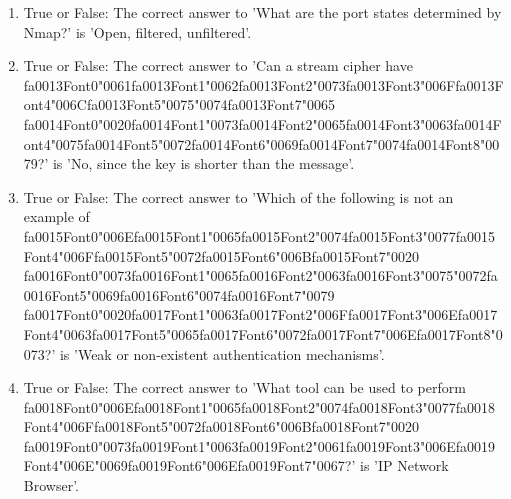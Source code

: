 \documentclass[12pt]{article}
\begin{document}
\begin{enumerate}[label=\arabic*.]
\item True or False: The correct answer to 'What are the port states determined by Nmap?' is 'Open, filtered, unfiltered'.
\item True or False: The correct answer to 'Can a stream cipher have {\csname fa0013Font0\endcsname\char"0061}{\csname fa0013Font1\endcsname\char"0062}{\csname fa0013Font2\endcsname\char"0073}{\csname fa0013Font3\endcsname\char"006F}{\csname fa0013Font4\endcsname\char"006C}{\csname fa0013Font5\endcsname\char"0075}{\char"0074}{\csname fa0013Font7\endcsname\char"0065} {\csname fa0014Font0\endcsname\char"0020}{\csname fa0014Font1\endcsname\char"0073}{\csname fa0014Font2\endcsname\char"0065}{\csname fa0014Font3\endcsname\char"0063}{\csname fa0014Font4\endcsname\char"0075}{\csname fa0014Font5\endcsname\char"0072}{\csname fa0014Font6\endcsname\char"0069}{\csname fa0014Font7\endcsname\char"0074}{\csname fa0014Font8\endcsname\char"0079}?' is 'No, since the key is shorter than the message'.
\item True or False: The correct answer to 'Which of the following is not an example of {\csname fa0015Font0\endcsname\char"006E}{\csname fa0015Font1\endcsname\char"0065}{\csname fa0015Font2\endcsname\char"0074}{\csname fa0015Font3\endcsname\char"0077}{\csname fa0015Font4\endcsname\char"006F}{\csname fa0015Font5\endcsname\char"0072}{\csname fa0015Font6\endcsname\char"006B}{\csname fa0015Font7\endcsname\char"0020} {\csname fa0016Font0\endcsname\char"0073}{\csname fa0016Font1\endcsname\char"0065}{\csname fa0016Font2\endcsname\char"0063}{\csname fa0016Font3\endcsname\char"0075}{\char"0072}{\csname fa0016Font5\endcsname\char"0069}{\csname fa0016Font6\endcsname\char"0074}{\csname fa0016Font7\endcsname\char"0079} {\csname fa0017Font0\endcsname\char"0020}{\csname fa0017Font1\endcsname\char"0063}{\csname fa0017Font2\endcsname\char"006F}{\csname fa0017Font3\endcsname\char"006E}{\csname fa0017Font4\endcsname\char"0063}{\csname fa0017Font5\endcsname\char"0065}{\csname fa0017Font6\endcsname\char"0072}{\csname fa0017Font7\endcsname\char"006E}{\csname fa0017Font8\endcsname\char"0073}?' is 'Weak or non-existent authentication mechanisms'.
\item True or False: The correct answer to 'What tool can be used to perform {\csname fa0018Font0\endcsname\char"006E}{\csname fa0018Font1\endcsname\char"0065}{\csname fa0018Font2\endcsname\char"0074}{\csname fa0018Font3\endcsname\char"0077}{\csname fa0018Font4\endcsname\char"006F}{\csname fa0018Font5\endcsname\char"0072}{\csname fa0018Font6\endcsname\char"006B}{\csname fa0018Font7\endcsname\char"0020} {\csname fa0019Font0\endcsname\char"0073}{\csname fa0019Font1\endcsname\char"0063}{\csname fa0019Font2\endcsname\char"0061}{\csname fa0019Font3\endcsname\char"006E}{\csname fa0019Font4\endcsname\char"006E}{\char"0069}{\csname fa0019Font6\endcsname\char"006E}{\csname fa0019Font7\endcsname\char"0067}?' is 'IP Network Browser'.

\end{enumerate}
\end{document}
